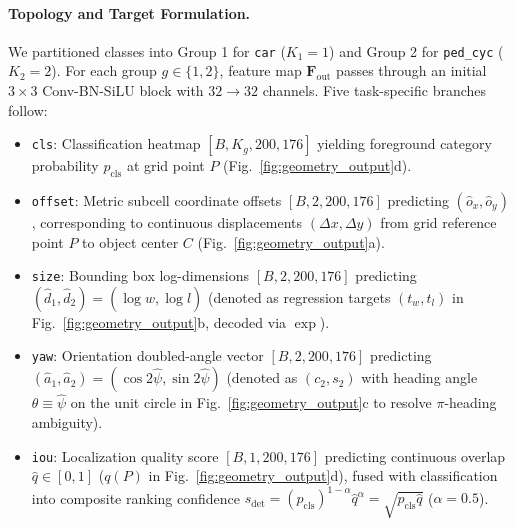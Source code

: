 \paragraph{Topology and Target Formulation.}
We partitioned classes into Group 1 for \texttt{car} ($K_1 = 1$) and Group 2 for \texttt{ped\_cyc} ($K_2 = 2$). For each group $g \in \{1, 2\}$, feature map $\mathbf{F}_{\mathrm{out}}$ passes through an initial $3 \times 3$ Conv-BN-SiLU block with $32 \rightarrow 32$ channels. Five task-specific branches follow:
\begin{itemize}
    \item \texttt{cls}: Classification heatmap $[B, K_g, 200, 176]$ yielding foreground category probability $p_{\mathrm{cls}}$ at grid point $P$ (Fig.~\ref{fig:geometry_output}d).
    \item \texttt{offset}: Metric subcell coordinate offsets $[B,\allowbreak 2,\allowbreak 200,\allowbreak 176]$ predicting $(\hat{o}_x, \hat{o}_y)$, corresponding to continuous displacements $(\Delta x, \Delta y)$ from grid reference point $P$ to object center $C$ (Fig.~\ref{fig:geometry_output}a).
    \item \texttt{size}: Bounding box log-dimensions $[B, 2, 200, 176]$ predicting $(\hat{d}_1, \hat{d}_2) = (\log \hat{w}, \log \hat{l})$ (denoted as regression targets $(t_w, t_l)$ in Fig.~\ref{fig:geometry_output}b, decoded via $\exp$).
    \item \texttt{yaw}: Orientation doubled-angle vector $[B, 2, 200, 176]$ predicting $(\hat{a}_1, \hat{a}_2) = (\cos 2\hat{\psi}, \sin 2\hat{\psi})$ (denoted as $(c_2, s_2)$ with heading angle $\theta \equiv \hat{\psi}$ on the unit circle in Fig.~\ref{fig:geometry_output}c to resolve $\pi$-heading ambiguity).
    \item \texttt{iou}: Localization quality score $[B, 1, 200, 176]$ predicting continuous overlap $\hat{q} \in [0, 1]$ ($q(P)$ in Fig.~\ref{fig:geometry_output}d), fused with classification into composite ranking confidence $s_{\mathrm{det}} = (p_{\mathrm{cls}})^{1-\alpha} \hat{q}^\alpha = \sqrt{p_{\mathrm{cls}} \hat{q}}$ ($\alpha=0.5$).
\end{itemize}

